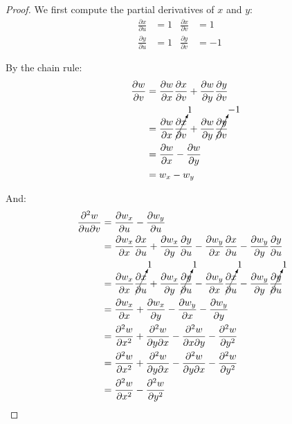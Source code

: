 \begin{proof}
    We first compute the partial derivatives of \(x\) and \(y\):
    \begin{align}
        \frac{\partial x}{\partial u} &= 1 & \frac{\partial x}{\partial v} &= 1 \\
        \frac{\partial y}{\partial u} &= 1 & \frac{\partial y}{\partial v} &= -1
    \end{align}
    
    By the chain rule:
    \begin{align*}
        \frac{\partial w}{\partial v} &= \frac{\partial w}{\partial x}\frac{\partial x}{\partial v} + \frac{\partial w}{\partial y}\frac{\partial y}{\partial v} \\
        &= \frac{\partial w}{\partial x}\cancelto{1}{\frac{\partial x}{\partial v}} + \frac{\partial w}{\partial y}\cancelto{-1}{\frac{\partial y}{\partial v}} \\
        &= \frac{\partial w}{\partial x} - \frac{\partial w}{\partial y} \\
        &= w_x - w_y
    \end{align*}
    
    And:
    \begin{align*}
        \frac{\partial^2 w}{\partial u \partial v} &= \frac{\partial w_x}{\partial u} - \frac{\partial w_y}{\partial u} \\
        &= \frac{\partial w_x}{\partial x}\frac{\partial x}{\partial u} + \frac{\partial w_x}{\partial y}\frac{\partial y}{\partial u} - \frac{\partial w_y}{\partial x}\frac{\partial x}{\partial u} - \frac{\partial w_y}{\partial y}\frac{\partial y}{\partial u} \\
        &= \frac{\partial w_x}{\partial x}\cancelto{1}{\frac{\partial x}{\partial u}} + \frac{\partial w_x}{\partial y}\cancelto{1}{\frac{\partial y}{\partial u}} - \frac{\partial w_y}{\partial x}\cancelto{1}{\frac{\partial x}{\partial u}} - \frac{\partial w_y}{\partial y}\cancelto{1}{\frac{\partial y}{\partial u}} \\
        &= \frac{\partial w_x}{\partial x} + \frac{\partial w_x}{\partial y} - \frac{\partial w_y}{\partial x} - \frac{\partial w_y}{\partial y} \\
        &= \frac{\partial^2 w}{\partial x^2} + \frac{\partial^2 w}{\partial y \partial x} - \frac{\partial^2 w}{\partial x \partial y} - \frac{\partial^2 w}{\partial y^2} \\
        &= \frac{\partial^2 w}{\partial x^2} + \frac{\partial^2 w}{\partial y \partial x} - \frac{\partial^2 w}{\partial y \partial x} - \frac{\partial^2 w}{\partial y^2} \\
        &= \frac{\partial^2 w}{\partial x^2} - \frac{\partial^2 w}{\partial y^2} 
    \end{align*}
\end{proof}